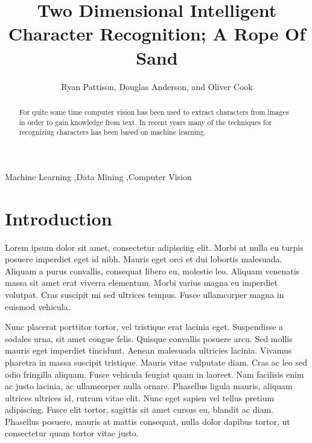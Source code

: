 \documentclass[preprint,5p,times,twocolumn]{elsarticle}
\begin{document}
\begin{frontmatter}

\title{Two Dimensional Intelligent Character Recognition; A Rope Of Sand}


\author[ryan,doug,oliver]{Ryan Pattison, Douglas Anderson, and Oliver Cook}

\address[ryan]{ryan.m.pattison@gmail.com}
\address[doug]{dander01@guelph.ca}
\address[oliver]{cooko@uoguelph.ca}
 
\begin{abstract}

For quite some time computer vision has been used to extract characters from
images in order to gain knowledge from text. In recent years many of the
techniques for recognizing characters has been based on machine learning.

\end{abstract}

\begin{keyword}
Machine Learning \sep Data Mining \sep Computer Vision

\end{keyword}

\end{frontmatter}


\section{Introduction}
\label{intro}
Lorem ipsum dolor sit amet, consectetur adipiscing elit. Morbi at nulla eu
turpis posuere imperdiet eget id nibh. Mauris eget orci et dui lobortis
malesuada. Aliquam a purus convallis, consequat libero eu, molestie leo.
Aliquam venenatis massa sit amet erat viverra elementum. Morbi varius magna eu
imperdiet volutpat. Cras suscipit mi sed ultrices tempus. Fusce ullamcorper
magna in euismod vehicula.


Nunc placerat porttitor tortor, vel tristique erat lacinia eget. Suspendisse a
sodales urna, sit amet congue felis. Quisque convallis posuere arcu. Sed mollis
mauris eget imperdiet tincidunt. Aenean malesuada ultricies lacinia. Vivamus
pharetra in massa suscipit tristique. Mauris vitae vulputate diam. Cras ac leo
sed odio fringilla aliquam. Fusce vehicula feugiat quam in laoreet. Nam
facilisis enim ac justo lacinia, ac ullamcorper nulla ornare. Phasellus ligula
mauris, aliquam ultrices ultrices id, rutrum vitae elit. Nunc eget sapien vel
tellus pretium adipiscing. Fusce elit tortor, sagittis sit amet cursus eu,
blandit ac diam. Phasellus posuere, mauris at mattis consequat, nulla dolor
dapibus tortor, ut consectetur quam tortor vitae justo.
\end{document}
